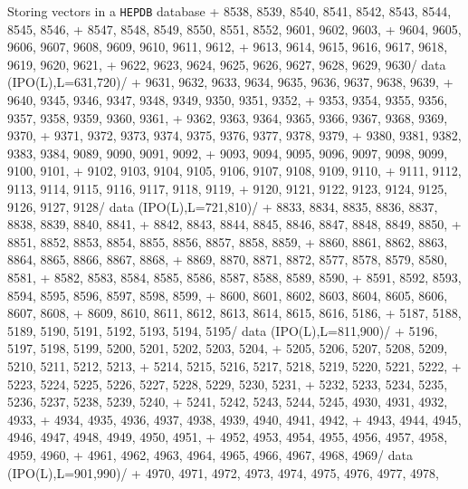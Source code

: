 \begin{XMPt}{Storing vectors in a {\tt HEPDB} database}
     +  8538,  8539,  8540,  8541,  8542,  8543,  8544,  8545,  8546,
     +  8547,  8548,  8549,  8550,  8551,  8552,  9601,  9602,  9603,
     +  9604,  9605,  9606,  9607,  9608,  9609,  9610,  9611,  9612,
     +  9613,  9614,  9615,  9616,  9617,  9618,  9619,  9620,  9621,
     +  9622,  9623,  9624,  9625,  9626,  9627,  9628,  9629,  9630/
      data (IPO(L),L=631,720)/
     +  9631,  9632,  9633,  9634,  9635,  9636,  9637,  9638,  9639,
     +  9640,  9345,  9346,  9347,  9348,  9349,  9350,  9351,  9352,
     +  9353,  9354,  9355,  9356,  9357,  9358,  9359,  9360,  9361,
     +  9362,  9363,  9364,  9365,  9366,  9367,  9368,  9369,  9370,
     +  9371,  9372,  9373,  9374,  9375,  9376,  9377,  9378,  9379,
     +  9380,  9381,  9382,  9383,  9384,  9089,  9090,  9091,  9092,
     +  9093,  9094,  9095,  9096,  9097,  9098,  9099,  9100,  9101,
     +  9102,  9103,  9104,  9105,  9106,  9107,  9108,  9109,  9110,
     +  9111,  9112,  9113,  9114,  9115,  9116,  9117,  9118,  9119,
     +  9120,  9121,  9122,  9123,  9124,  9125,  9126,  9127,  9128/
      data (IPO(L),L=721,810)/
     +  8833,  8834,  8835,  8836,  8837,  8838,  8839,  8840,  8841,
     +  8842,  8843,  8844,  8845,  8846,  8847,  8848,  8849,  8850,
     +  8851,  8852,  8853,  8854,  8855,  8856,  8857,  8858,  8859,
     +  8860,  8861,  8862,  8863,  8864,  8865,  8866,  8867,  8868,
     +  8869,  8870,  8871,  8872,  8577,  8578,  8579,  8580,  8581,
     +  8582,  8583,  8584,  8585,  8586,  8587,  8588,  8589,  8590,
     +  8591,  8592,  8593,  8594,  8595,  8596,  8597,  8598,  8599,
     +  8600,  8601,  8602,  8603,  8604,  8605,  8606,  8607,  8608,
     +  8609,  8610,  8611,  8612,  8613,  8614,  8615,  8616,  5186,
     +  5187,  5188,  5189,  5190,  5191,  5192,  5193,  5194,  5195/
      data (IPO(L),L=811,900)/
     +  5196,  5197,  5198,  5199,  5200,  5201,  5202,  5203,  5204,
     +  5205,  5206,  5207,  5208,  5209,  5210,  5211,  5212,  5213,
     +  5214,  5215,  5216,  5217,  5218,  5219,  5220,  5221,  5222,
     +  5223,  5224,  5225,  5226,  5227,  5228,  5229,  5230,  5231,
     +  5232,  5233,  5234,  5235,  5236,  5237,  5238,  5239,  5240,
     +  5241,  5242,  5243,  5244,  5245,  4930,  4931,  4932,  4933,
     +  4934,  4935,  4936,  4937,  4938,  4939,  4940,  4941,  4942,
     +  4943,  4944,  4945,  4946,  4947,  4948,  4949,  4950,  4951,
     +  4952,  4953,  4954,  4955,  4956,  4957,  4958,  4959,  4960,
     +  4961,  4962,  4963,  4964,  4965,  4966,  4967,  4968,  4969/
      data (IPO(L),L=901,990)/
     +  4970,  4971,  4972,  4973,  4974,  4975,  4976,  4977,  4978,

\end{XMPt}
